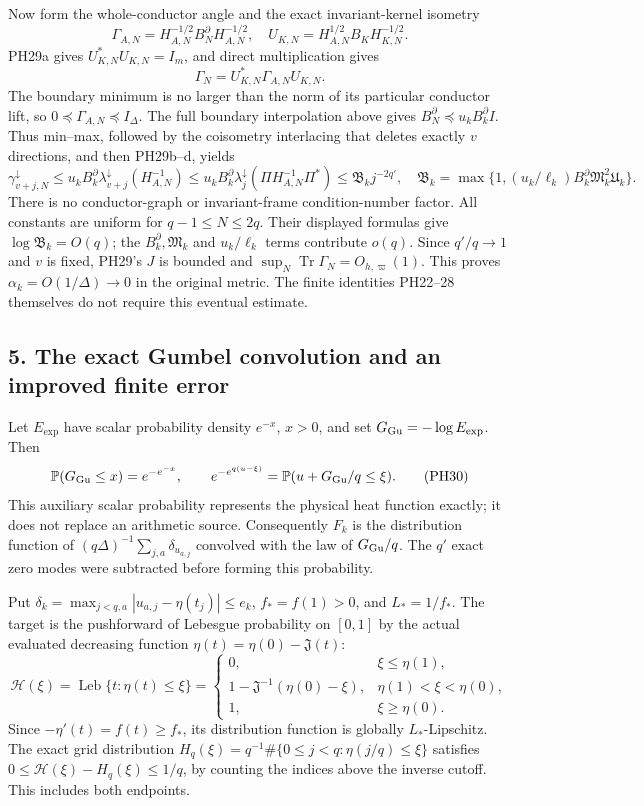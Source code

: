 \documentclass[10pt]{article}
\begin{document}
Now form the whole-conductor angle and the exact invariant-kernel isometry \[
 \Gamma_{A,N}=H_{A,N}^{-1/2}B_N^\partial H_{A,N}^{-1/2},
 \quad U_{K,N}=H_{A,N}^{1/2}B_KH_{K,N}^{-1/2}.
\] PH29a gives \(U_{K,N}^*U_{K,N}=I_m\), and direct multiplication gives \[
 \Gamma_N=U_{K,N}^*\Gamma_{A,N}U_{K,N}.
 \tag{PH29e}
\] The boundary minimum is no larger than the norm of its particular conductor lift, so \(0\preceq\Gamma_{A,N}\preceq I_\Delta\). The full boundary interpolation above gives \(B_N^\partial\preceq u_kB_k^\partial I\). Thus min--max, followed by the coisometry interlacing that deletes exactly \(v\) directions, and then PH29b--d, yields \[
 \gamma_{v+j,N}^\downarrow
 \le u_kB_k^\partial\lambda_{v+j}^\downarrow(H_{A,N}^{-1})
 \le u_kB_k^\partial\lambda_j^\downarrow(\Pi H_{A,N}^{-1}\Pi^*)
 \le\mathfrak B_kj^{-2q'},\quad
 \mathfrak B_k=\max\{1,(u_k/\ell_k)B_k^\partial\mathfrak M_k^2\mathfrak U_k\}.
 \tag{PH29f}
\] There is no conductor-graph or invariant-frame condition-number factor. All constants are uniform for \(q-1\le N\le2q\). Their displayed formulas give \(\log\mathfrak B_k=O(q)\); the \(B_k^\partial,\mathfrak M_k\) and \(u_k/\ell_k\) terms contribute \(o(q)\). Since \(q'/q\to1\) and \(v\) is fixed, PH29's \(J\) is bounded and \(\sup_N\operatorname{Tr}\Gamma_N=O_{h,\varpi}(1)\). This proves \(\alpha_k=O(1/\Delta)\to0\) in the original metric. The finite identities PH22--28 themselves do not require this eventual estimate.

\subsection{5. The exact Gumbel convolution and an improved finite error}\label{the-exact-gumbel-convolution-and-an-improved-finite-error}

Let \(E_{\exp}\) have scalar probability density \(e^{-x}\), \(x>0\), and set \(G_{\rm Gu}=-\log E_{\exp}\). Then \[
 \mathbb P(G_{\rm Gu}\le x)=e^{-e^{-x}},\qquad
 e^{-e^{q(u-\xi)}}=\mathbb P(u+G_{\rm Gu}/q\le\xi).
 \tag{PH30}
\] This auxiliary scalar probability represents the physical heat function exactly; it does not replace an arithmetic source. Consequently \(F_k\) is the distribution function of \((q\Delta)^{-1}\sum_{j,a}\delta_{u_{a,j}}\) convolved with the law of \(G_{\rm Gu}/q\). The \(q'\) exact zero modes were subtracted before forming this probability.

Put \(\delta_k=\max_{j<q,a}|u_{a,j}-\eta(t_j)|\le e_k\), \(f_*=f(1)>0\), and \(L_*=1/f_*\). The target is the pushforward of Lebesgue probability on \([0,1]\) by the actual evaluated decreasing function \(\eta(t)=\eta(0)-\mathfrak J(t)\): \[
 \mathcal H(\xi)=\operatorname{Leb}\{t:\eta(t)\le\xi\}
 =\begin{cases}
 0,&\xi\le\eta(1),\\
 1-\mathfrak J^{-1}(\eta(0)-\xi),&\eta(1)<\xi<\eta(0),\\
 1,&\xi\ge\eta(0).
 \end{cases}
 \tag{PH31}
\] Since \(-\eta'(t)=f(t)\ge f_*\), its distribution function is globally \(L_*\)-Lipschitz. The exact grid distribution \(H_q(\xi)=q^{-1}\#\{0\le j<q:\eta(j/q)\le\xi\}\) satisfies \(0\le\mathcal H(\xi)-H_q(\xi)\le1/q\), by counting the indices above the inverse cutoff. This includes both endpoints.
\end{document}
